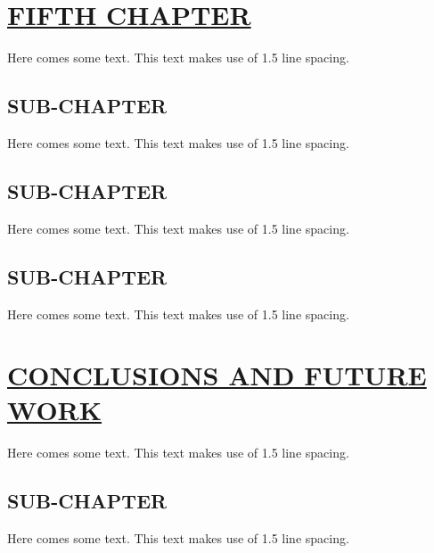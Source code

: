 \documentclass{article}
\begin{document}
{{{{{{{\section{\uline{FIFTH CHAPTER}}
Here comes some text. This text makes use of 1.5 line spacing. 
\subsection{SUB-CHAPTER}
Here comes some text. This text makes use of 1.5 line spacing. 
\subsection{SUB-CHAPTER}
Here comes some text. This text makes use of 1.5 line spacing. 
\subsection{SUB-CHAPTER}
Here comes some text. This text makes use of 1.5 line spacing. 
\pagebreak
\section{\uline{CONCLUSIONS AND FUTURE WORK}}
Here comes some text. This text makes use of 1.5 line spacing. 
\subsection{SUB-CHAPTER}
Here comes some text. This text makes use of 1.5 line spacing. 
}}}}}}}
\end{document}
